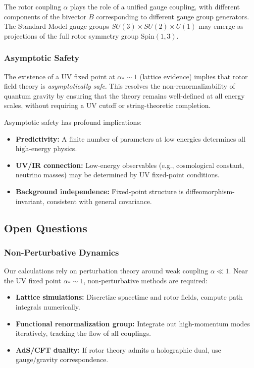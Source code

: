 \documentclass[11pt,a4paper]{article}
\numberwithin{equation}{section}
\theoremstyle{plain}
\theoremstyle{definition}
\theoremstyle{remark}
\newcommand{\Spin}{\mathrm{Spin}}
\begin{document}
The rotor coupling $\alpha$ plays the role of a unified gauge coupling, with different components of the bivector $B$ corresponding to different gauge group generators. The Standard Model gauge groups $SU(3)\times SU(2)\times U(1)$ may emerge as projections of the full rotor symmetry group $\Spin(1,3)$.

\subsubsection{Asymptotic Safety}

The existence of a UV fixed point at $\alpha_*\sim 1$ (lattice evidence) implies that rotor field theory is \emph{asymptotically safe}. This resolves the non-renormalizability of quantum gravity by ensuring that the theory remains well-defined at all energy scales, without requiring a UV cutoff or string-theoretic completion.

Asymptotic safety has profound implications:
\begin{itemize}
  \item \textbf{Predictivity:} A finite number of parameters at low energies determines all high-energy physics.
  \item \textbf{UV/IR connection:} Low-energy observables (e.g., cosmological constant, neutrino masses) may be determined by UV fixed-point conditions.
  \item \textbf{Background independence:} Fixed-point structure is diffeomorphism-invariant, consistent with general covariance.
\end{itemize}

\subsection{Open Questions}

\subsubsection{Non-Perturbative Dynamics}

Our calculations rely on perturbation theory around weak coupling $\alpha\ll 1$. Near the UV fixed point $\alpha_*\sim 1$, non-perturbative methods are required:
\begin{itemize}
  \item \textbf{Lattice simulations:} Discretize spacetime and rotor fields, compute path integrals numerically.
  \item \textbf{Functional renormalization group:} Integrate out high-momentum modes iteratively, tracking the flow of all couplings.
  \item \textbf{AdS/CFT duality:} If rotor theory admits a holographic dual, use gauge/gravity correspondence.
\end{itemize}
\end{document}
